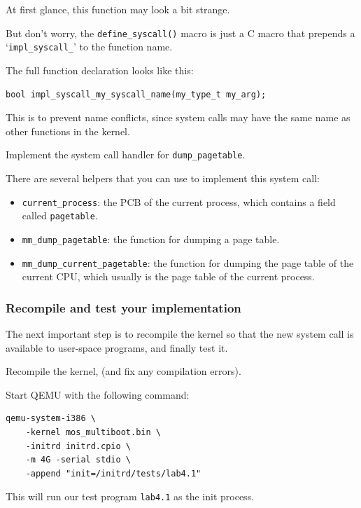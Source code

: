 \begin{note}
    \item At first glance, this function may look a bit strange.

    \item But don't worry, the \texttt{define\_syscall()} macro is just a
    C macro that prepends a `\texttt{impl\_syscall\_}' to the function name.

    The full function declaration looks like this:

    \begin{verbatim}
bool impl_syscall_my_syscall_name(my_type_t my_arg);
    \end{verbatim}

    \item This is to prevent name conflicts, since system calls may have the same
    name as other functions in the kernel.
\end{note}

\begin{exercise}
    \item Implement the system call handler for \texttt{dump\_pagetable}.
\end{exercise}

There are several helpers that you can use to implement this system call:

\begin{itemize}
    \item \texttt{current\_process}: the PCB of the current process, which contains
          a field called \texttt{pagetable}.
    \item \texttt{mm\_dump\_pagetable}: the function for dumping a page table.
    \item \texttt{mm\_dump\_current\_pagetable}: the function for dumping the page
          table of the current CPU, which usually is the page table of the current
          process.
\end{itemize}

\subsubsection{Recompile and test your implementation}

The next important step is to recompile the kernel so that the new system call
is available to user-space programs, and finally test it.

\begin{exercise}
    \item Recompile the kernel, (and fix any compilation errors).
    \item Start QEMU with the following command:
    \begin{verbatim}
qemu-system-i386 \
    -kernel mos_multiboot.bin \
    -initrd initrd.cpio \
    -m 4G -serial stdio \
    -append "init=/initrd/tests/lab4.1"
    \end{verbatim}
    This will run our test program \texttt{lab4.1} as the init process.
\end{exercise}

